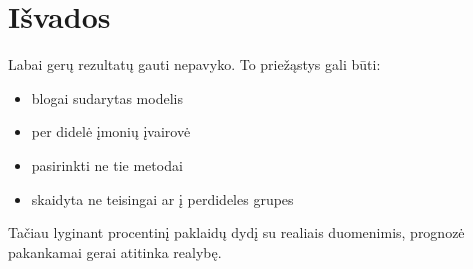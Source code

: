\documentclass[a4paper]{article}
\begin{document}
\section{Išvados}

Labai gerų rezultatų gauti nepavyko. To priežąstys gali būti:
\begin{itemize}
  \item blogai sudarytas modelis
  \item per didelė įmonių įvairovė
  \item pasirinkti ne tie metodai
  \item skaidyta ne teisingai ar į perdideles grupes
\end{itemize}
Tačiau lyginant procentinį paklaidų dydį su realiais duomenimis,
prognozė pakankamai gerai atitinka realybę.
\end{document}
